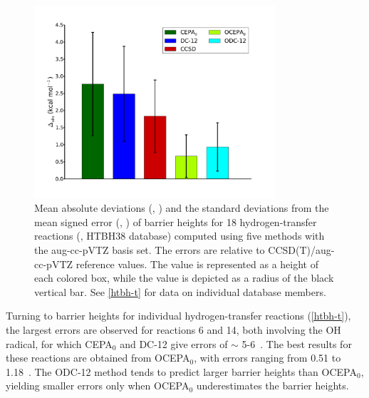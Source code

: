 \begin{figure}
	\centering
	\caption{%
        \label{htbh-f}
        Mean absolute deviations (\mae, \kcal) and the standard deviations from
        the mean signed error (\std, \kcal) of barrier heights for 18
        hydrogen-transfer reactions (,
        HTBH38 database) computed using five methods with the aug-cc-pVTZ basis
        set.
        The errors are relative to CCSD(T)/aug-cc-pVTZ reference values.
        The \mae value is represented as a height of each colored box, while the
        \std value is depicted as a radius of the black vertical bar.
        See \cref{htbh-t} for data on individual database members.
	}
	\includegraphics[width=0.8\textwidth]{figures/htbh.pdf}
\end{figure}

Turning to barrier heights for individual hydrogen-transfer reactions
(\cref{htbh-t}), the largest errors are observed for reactions 6 and 14, both
involving the OH radical, for which CEPA$_0$ and DC-12 give errors of $\sim$
5-6~\kcal.
The best results for these reactions are obtained from OCEPA$_0$, with errors
ranging from 0.51 to 1.18~\kcal.
The ODC-12 method tends to predict larger barrier heights than OCEPA$_0$,
yielding smaller errors only when OCEPA$_0$ underestimates the barrier heights.

